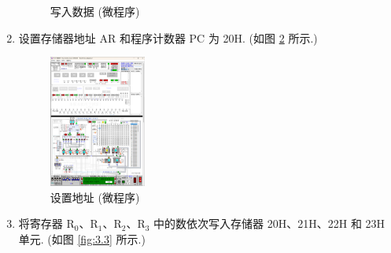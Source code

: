\documentclass[../main.tex]{subfiles}
\begin{document}
\begin{enumerate}
\begin{figure}[htbp]
{              }
              \caption{写入数据 (微程序)}
              \label{fig:3.1}
          \end{figure}

    \item 设置存储器地址 AR 和程序计数器 PC 为 20H. (如图 \ref{fig:3.2} 所示.)

          \begin{figure}[htbp]
              \centering
              \includegraphics[width=0.3\textwidth]{screenshots/3.1.5.png}
              \caption{设置地址 (微程序)}
              \label{fig:3.2}
          \end{figure}

    \item 将寄存器 R$_0$、R$_1$、R$_2$、R$_3$ 中的数依次写入存储器 20H、21H、22H 和 23H 单元. (如图 \ref{fig:3.3} 所示.)


\end{enumerate}
\end{document}
